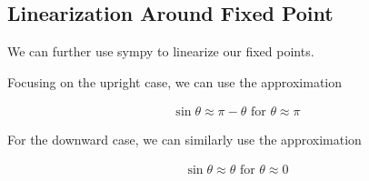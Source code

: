 \documentclass[conference]{IEEEtran}
\begin{document}







\subsection{Linearization Around Fixed Point}

We can further use sympy to linearize our fixed points.

Focusing on the upright case, we can use the approximation

\begin{align}
    \sin\theta \approx \pi - \theta \text{ for } \theta \approx \pi
\end{align}

For the downward case, we can similarly use the approximation

\begin{align}
    \sin\theta \approx \theta \text{ for } \theta \approx 0
\end{align}
\end{document}
